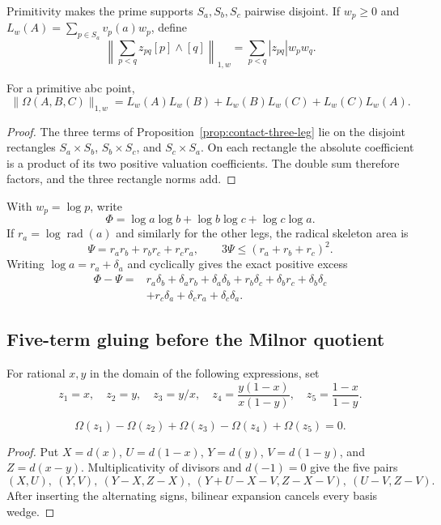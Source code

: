 Primitivity makes the prime supports $S_a,S_b,S_c$ pairwise disjoint.  If
$w_p\geq0$ and $L_w(A)=\sum_{p\in S_a}v_p(a)w_p$, define
\[
 \left\|\sum_{p<q}z_{pq}[p]\wedge[q]\right\|_{1,w}
   =\sum_{p<q}|z_{pq}|w_pw_q.
\]

\begin{proposition}
\label{prop:contact-area}
For a primitive abc point,
\[
 \|\Omega(A,B,C)\|_{1,w}
 =L_w(A)L_w(B)+L_w(B)L_w(C)+L_w(C)L_w(A).
\]
\end{proposition}

\begin{proof}
The three terms of Proposition~\ref{prop:contact-three-leg} lie on the
disjoint rectangles $S_a\times S_b$, $S_b\times S_c$, and
$S_c\times S_a$.  On each rectangle the absolute coefficient is a product
of its two positive valuation coefficients.  The double sum therefore
factors, and the three rectangle norms add.
\end{proof}

With $w_p=\log p$, write
\begin{equation}
 \Phi=\log a\log b+\log b\log c+\log c\log a.
 \label{eq:full-contact-area}
\end{equation}
If $r_a=\log\operatorname{rad}(a)$ and similarly for the other legs, the
radical skeleton area is
\[
 \Psi=r_ar_b+r_br_c+r_cr_a,
 \qquad 3\Psi\leq(r_a+r_b+r_c)^2.
\]
Writing $\log a=r_a+\delta_a$ and cyclically gives the exact positive excess
\begin{align*}
 \Phi-\Psi={}&r_a\delta_b+\delta_ar_b+\delta_a\delta_b
 +r_b\delta_c+\delta_br_c+\delta_b\delta_c\\
 &+r_c\delta_a+\delta_cr_a+\delta_c\delta_a.
\end{align*}

\subsection{Five-term gluing before the Milnor quotient}

For rational $x,y$ in the domain of the following expressions, set
\[
 z_1=x,\quad z_2=y,\quad z_3=y/x,\quad
 z_4=\frac{y(1-x)}{x(1-y)},\quad
 z_5=\frac{1-x}{1-y}.
\]

\begin{theorem}
\label{thm:contact-five-term}
\[
 \Omega(z_1)-\Omega(z_2)+\Omega(z_3)-\Omega(z_4)+\Omega(z_5)=0.
\]
\end{theorem}

\begin{proof}
Put $X=d(x)$, $U=d(1-x)$, $Y=d(y)$, $V=d(1-y)$, and
$Z=d(x-y)$.  Multiplicativity of divisors and $d(-1)=0$ give the five pairs
\[
 (X,U),\ (Y,V),\ (Y-X,Z-X),\
 (Y+U-X-V,Z-X-V),\ (U-V,Z-V).
\]
After inserting the alternating signs, bilinear expansion cancels every
basis wedge.
\end{proof}

